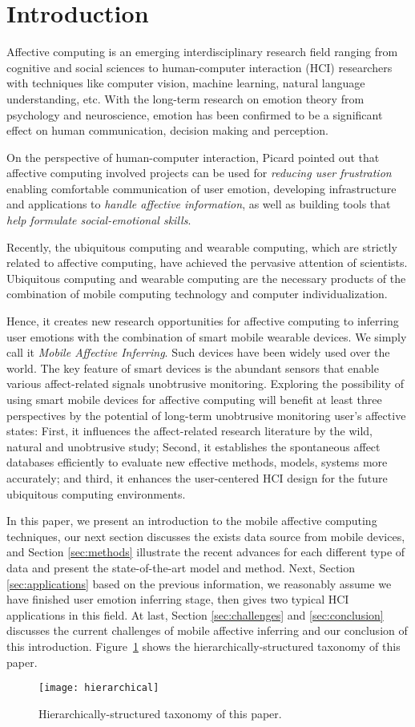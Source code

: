 \section{Introduction}\label{sec:intro}

Affective computing is an emerging interdisciplinary research field ranging from cognitive and social sciences to human-computer interaction (HCI) researchers with techniques like computer vision, machine learning, natural language understanding, etc.
With the long-term research on emotion theory from psychology and neuroscience\cite{james1884emotion, turkle2005second}, emotion has been confirmed to be a significant effect \cite{james2013emotion} on human communication, decision making and perception.

On the perspective of human-computer interaction, Picard \cite{picard1999affective} pointed out that affective computing involved projects can be used for \emph{reducing user frustration} enabling comfortable communication of user emotion, developing infrastructure and applications to \emph{handle affective information}, as well as building tools that \emph{help formulate social-emotional skills}.

Recently, the ubiquitous computing\cite{weiser1991computer} and wearable computing\cite{starner1996human}, which are strictly related to affective computing, have achieved the pervasive attention of scientists. Ubiquitous computing and wearable computing are the necessary products of the combination of mobile computing technology and computer individualization.

Hence, it creates new research opportunities for affective computing to inferring user emotions with the combination of smart mobile wearable devices. We simply call it \emph{Mobile Affective Inferring}. Such devices have been widely used over the world. The key feature of smart devices is the abundant sensors that enable various affect-related signals unobtrusive monitoring. Exploring the possibility of using smart mobile devices for affective computing will benefit at least three perspectives by the potential of long-term unobtrusive monitoring user’s affective states: First, it influences the affect-related research literature by the wild, natural and unobtrusive study; Second, it establishes the spontaneous affect databases efficiently to evaluate new effective methods, models, systems more accurately; and third, it enhances the user-centered HCI design for the future ubiquitous computing environments.

In this paper, we present an introduction to the mobile affective computing techniques, our next section discusses the exists data source from mobile devices, and Section \ref{sec:methods} illustrate the recent advances for each different type of data and present the state-of-the-art model and method. Next, Section \ref{sec:applications} based on the previous information, we reasonably assume we have finished user emotion inferring stage, then gives two typical HCI applications in this field. At last, Section \ref{sec:challenges} and \ref{sec:conclusion} discusses the current challenges of mobile affective inferring and our conclusion of this introduction.
Figure~\ref{fig:hierarchically} shows the hierarchically-structured taxonomy of this paper.

\begin{figure}[htb]
    \centering
    \texttt{[image: hierarchical]}
    \caption{Hierarchically-structured taxonomy of this paper.}
    \label{fig:hierarchically}
\end{figure}